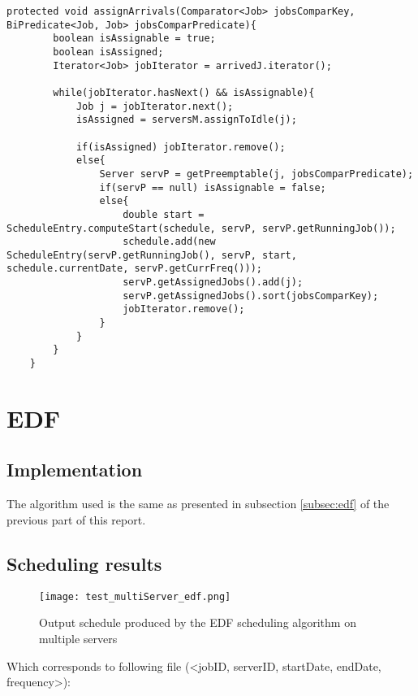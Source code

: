 \documentclass[./report.tex]{subfiles}
\begin{document}
\begin{lstlisting}[style=Java, caption={Source code of the \textit{assignArrivals()} used by the \textit{SchedulerPriority} family of Schedulers}]
	protected void assignArrivals(Comparator<Job> jobsComparKey, BiPredicate<Job, Job> jobsComparPredicate){
		boolean isAssignable = true;
		boolean isAssigned;
		Iterator<Job> jobIterator = arrivedJ.iterator();
		
		while(jobIterator.hasNext() && isAssignable){
			Job j = jobIterator.next();
			isAssigned = serversM.assignToIdle(j);
			
			if(isAssigned) jobIterator.remove();
			else{
				Server servP = getPreemptable(j, jobsComparPredicate);
				if(servP == null) isAssignable = false;
				else{
					double start = ScheduleEntry.computeStart(schedule, servP, servP.getRunningJob());
					schedule.add(new ScheduleEntry(servP.getRunningJob(), servP, start, schedule.currentDate, servP.getCurrFreq()));
					servP.getAssignedJobs().add(j);
					servP.getAssignedJobs().sort(jobsComparKey);
					jobIterator.remove();
				}
			}
		}
	}
\end{lstlisting}
 
\newpage
\section{EDF}
\subsection{Implementation}
The algorithm used is the same as presented in subsection \ref{subsec:edf} of the previous part of this report.

\subsection{Scheduling results}
\begin{figure}[!h]
	\center
	\texttt{[image: test\_multiServer\_edf.png]}
	\caption{Output schedule produced by the EDF scheduling algorithm on multiple servers}
	\label{fig:multiServer_edf} 
\end{figure}

Which corresponds to following file (<jobID, serverID, startDate, endDate, frequency>):


\newpage
\end{document}
